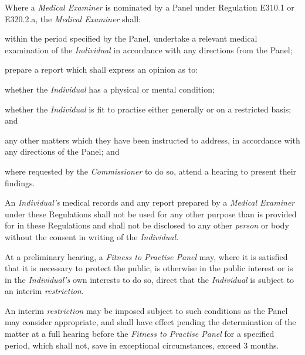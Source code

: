 \par
{}
Where a \emph{Medical Examiner} is nominated by a Panel under Regulation
E310.1 or E320.2.a, the \emph{Medical Examiner} shall:\\\nl \item within the period specified by the Panel, undertake a relevant
medical examination of the \emph{Individual} in accordance with any
directions from the Panel;\item prepare a report which shall express an opinion as to:\al \item whether the \emph{Individual} has a physical or mental condition;\\
\item  whether the \emph{Individual} is fit to practise either generally or
on a restricted basis; and\\
\item any other matters which they have been instructed to address, in
accordance with any directions of the Panel; and\la
\item where requested by the \emph{Commissioner} to do so, attend a hearing
to present their findings.\ln
{}\par
An \emph{Individual's} medical records and any report prepared by
a \emph{Medical Examiner} under these Regulations shall not be used for
any other purpose than is provided for in these Regulations and shall
not be disclosed to any other \emph{person} or body without the consent
in writing of the \emph{Individual.}\par
{}\par
{}
At a preliminary hearing, a \emph{Fitness to Practise Panel} may, where
it is satisfied that it is necessary to protect the public, is otherwise
in the public interest or is in the \emph{Individual's} own interests to
do so, direct that the \emph{Individual }is subject to an
interim \emph{restriction}.\\
\par
An interim \emph{restriction} may be imposed subject to such conditions
as the Panel may consider appropriate, and shall have effect pending the
determination of the matter at a full hearing before the \emph{Fitness
to Practise Panel} for a specified period, which shall not, save in
exceptional circumstances, exceed 3 months.\\
